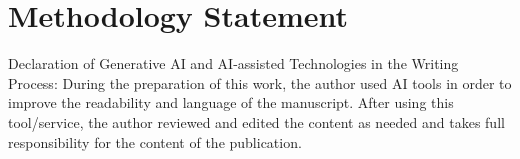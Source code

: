 \documentclass[12pt]{article}
\begin{document}
\section*{Methodology Statement}

Declaration of Generative AI and AI-assisted Technologies in the Writing Process: During the preparation of this work, the author used AI tools in order to improve the readability and language of the manuscript. After using this tool/service, the author reviewed and edited the content as needed and takes full responsibility for the content of the publication.
\end{document}
